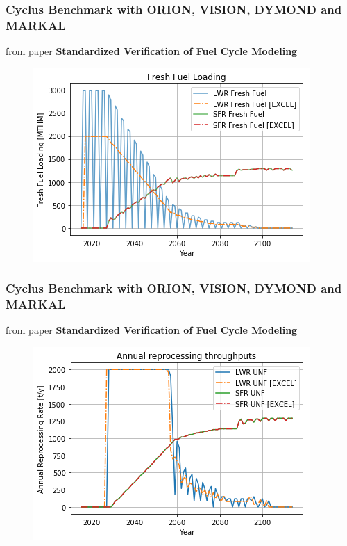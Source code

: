 \documentclass[9pt]{beamer}
\begin{document}
\begin{frame}
    \frametitle{Cyclus Benchmark with ORION, VISION, DYMOND and MARKAL}
    from paper \textbf{Standardized Verification of Fuel Cycle Modeling}
    \begin{figure}[htbp!]
        \begin{center}
                \includegraphics[width=.7\textwidth]{./images/verification/fuel_load.png}
        \end{center}
    \end{figure}

\end{frame}



\begin{frame}
    \frametitle{Cyclus Benchmark with ORION, VISION, DYMOND and MARKAL}
    from paper \textbf{Standardized Verification of Fuel Cycle Modeling}
    \begin{figure}[htbp!]
        \begin{center}
                \includegraphics[width=.7\textwidth]{./images/verification/rep.png}
        \end{center}
    \end{figure}

\end{frame}
\end{document}
